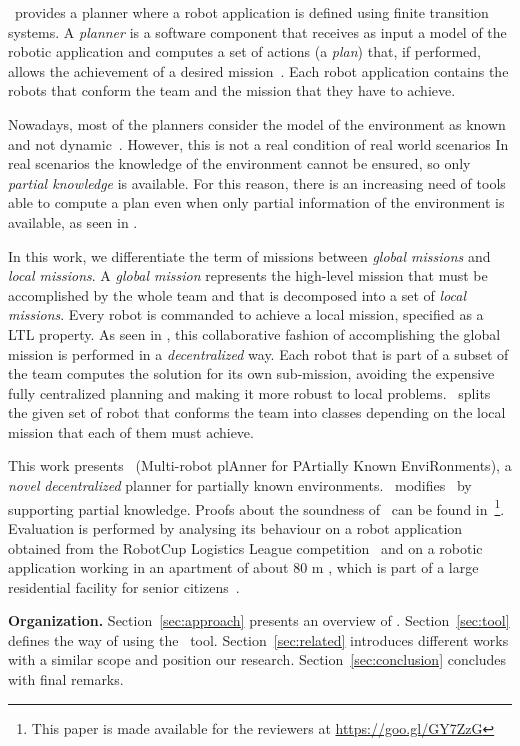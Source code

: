 \toolName\ provides a planner where a robot application is defined using finite transition systems.
A \emph{planner} is  a software component that receives as input a model of the robotic application and computes  a set of actions (a \emph{plan}) that, if performed, allows the achievement of a desired mission~\cite{latombe2012robot}.
Each robot application contains the robots that conform the team and the mission that they have to achieve.

Nowadays, most of the planners consider the model of the environment as known and not dynamic~\cite{7139412}. 
However, this is not a real condition of real world scenarios
In real scenarios the knowledge of the environment cannot be ensured, so only \emph{partial knowledge} is available.
For this reason, there is an increasing need of tools able to compute a plan even when only partial information of the environment is available, as seen in \cite{roy2006planning,du2012robot,diaz2001exploring}.

In this work, we differentiate the term of missions between \emph{global missions} and \emph{local missions}.
A \emph{global mission} represents the high-level mission that must be accomplished by the whole team \cite{kloetzer2011multi,loizou2005automated,quottrup2004multi} and that is decomposed into a set of \emph{local missions}\cite{schillinger2016decomposition,guo2015multi,guo2015multi,tumova2016multi}.
Every robot is commanded to achieve a local mission, specified as a LTL property.
As seen in \cite{tumova2016multi}, this collaborative fashion of accomplishing the global mission is performed in a \emph{decentralized} way.
Each robot that is part of a subset of the team computes the solution for its own sub-mission, avoiding the expensive fully centralized planning and making it more robust to local problems.
\toolName\ splits the given set of robot that conforms the team into classes depending on the local mission that each of them must achieve.

This work presents  \toolName\ (Multi-robot plAnner for PArtially Known EnviRonments), a \emph{novel} \emph{decentralized} planner for partially known environments.
\toolName\ modifies~\cite{tumova2016multi} by supporting partial knowledge.
Proofs about the soundness of \toolName\ can be found in~\cite{mapmaker17}\footnote{This paper is made available for the reviewers   at  \url{https://goo.gl/GY7ZzG}}.
Evaluation is performed by analysing its behaviour on a robot application obtained from the RobotCup Logistics League competition~\cite{karrasrobocup} and on a robotic application working in an apartment of about 80 m , which is part of
a large residential facility for senior citizens~\cite{map}.

\textbf{Organization.} 
Section~\ref{sec:approach} presents an overview of \toolName.
Section~\ref{sec:tool} defines the way of using the \toolName\ tool.
Section~\ref{sec:related} introduces different works with a similar scope and position our research.
Section~\ref{sec:conclusion} concludes with final remarks.

